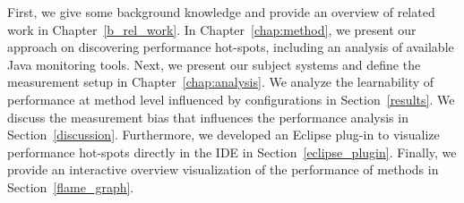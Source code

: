 
First, we give some background knowledge and provide an overview of related work in Chapter~\ref{b_rel_work}.
In Chapter~\ref{chap:method}, we present our approach on discovering performance hot-spots, including an analysis of available Java monitoring tools.
Next, we present our subject systems and define the measurement setup in Chapter~\ref{chap:analysis}. 
We analyze the learnability of performance at method level influenced by configurations in Section~\ref{results}.
We discuss the measurement bias that influences the performance analysis in Section~\ref{discussion}. 
Furthermore, we developed an Eclipse plug-in to visualize performance hot-spots directly in the \ac{IDE} in Section~\ref{eclipse_plugin}.
Finally, we provide an interactive overview visualization of the performance of methods in Section~\ref{flame_graph}. 

